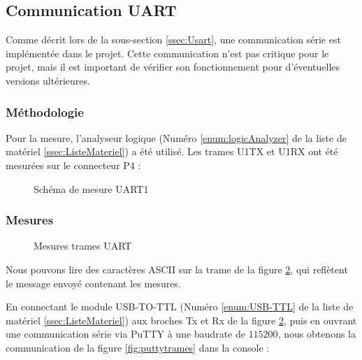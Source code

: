 \subsection{Communication UART}
{
	Comme décrit lors de la sous-section \ref{ssec:Usart}, une communication série est implémentée dans le projet. Cette communication n'est pas critique pour le projet, mais il est important de vérifier son fonctionnement pour d'éventuelles versions ultérieures.
	\subsubsection{Méthodologie}
	Pour la mesure, l'analyseur logique (Numéro \ref{enum:logicAnalyzer} de la liste de matériel \ref{ssec:ListeMateriel}) a été utilisé. Les trames U1TX et U1RX ont été mesurées sur le connecteur P4 :
	
	\begin{figure}[h]
		\centering
		\caption{Schéma de mesure UART1}
		\label{fig:schuart1}
	\end{figure}
	\clearpage	
	\subsubsection{Mesures}
	
	\begin{figure}[h]
		\centering
		\caption{Mesures trames UART}
		\label{fig:mesuretrameuart}
	\end{figure}
	Nous pouvons lire des caractères ASCII sur la trame de la figure \ref{fig:mesuretrameuart}, qui reflètent le message envoyé contenant les mesures. 
	
	En connectant le module USB-TO-TTL (Numéro \ref{enum:USB-TTL} de la liste de matériel \ref{ssec:ListeMateriel}) aux broches Tx et Rx de la figure \ref{fig:mesuretrameuart}, puis en ouvrant une communication série via PuTTY à une baudrate de $115200$, nous obtenons la communication de la figure \ref{fig:puttytrames} dans la console :
	
}
